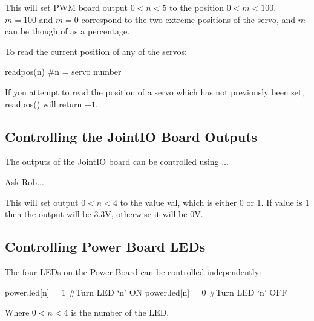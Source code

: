 \documentclass[a4paper, 12pt]{article}
\begin{document}
This will set PWM board output $0<n<5$ to the position $0<m<100$. \(m = 100\) and \(m = 0\) correspond to the two extreme positions of the servo, and \(m\) can be though of as a percentage.

\vspace{12pt}
To read the current position of any of the servos:
\begin{verbatimtab}
readpos(n)	#n = servo number 
\end{verbatimtab}
If you attempt to read the position of a servo which has not previously been set, readpos() will return \(-1\).

\subsection{Controlling the JointIO Board Outputs}
The outputs of the JointIO board can be controlled using ...

\begin{verbatimtab}
Ask Rob...
\end{verbatimtab}

This will set output $0<n<4$ to the value val, which is either 0 or 1.  If value is 1 then the output will be 3.3V, otherwise it will be 0V.

\subsection{Controlling Power Board LEDs}
The four LEDs on the Power Board can be controlled independently:
\begin{verbatimtab}
power.led[n] = 1	#Turn LED `n' ON
power.led[n] = 0	#Turn LED `n' OFF
\end{verbatimtab}
Where $0<n<4$ is the number of the LED.
\end{document}
